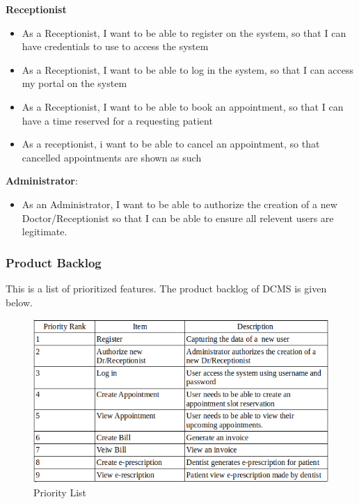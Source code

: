 \documentclass[12pt]{article}
\begin{document}
\textbf{Receptionist}
   
    \begin{itemize}
  \item
  As a Receptionist, I want to be able to register on the system, so that I can have credentials to use to access the system
  \item
  As a Receptionist, I want to be able to log in the system, so that I can access my portal on the system
  \item
  As a Receptionist, I want to be able to book an appointment, so that I can 				have a time reserved for a requesting patient
  \item
   As a receptionist,  i want to be able to cancel an appointment, so that cancelled appointments are shown as such
   \end{itemize}
   \textbf{Administrator}:
   \begin{itemize}
   \item
   As an Administrator, I want to be able to authorize the creation of a new Doctor/Receptionist so that I can be able to ensure all relevent users are legitimate.
   \end{itemize}
  \subsubsection{Product Backlog}
  This is a list of prioritized features. The product backlog of DCMS is given below.
  
  \begin{figure}[h]
    \centering
    
    \includegraphics[width=\linewidth]{PriorityList.png}
    \caption{Priority List}
    \label{fig:ERD}
    \end{figure}
    
\end{document}
